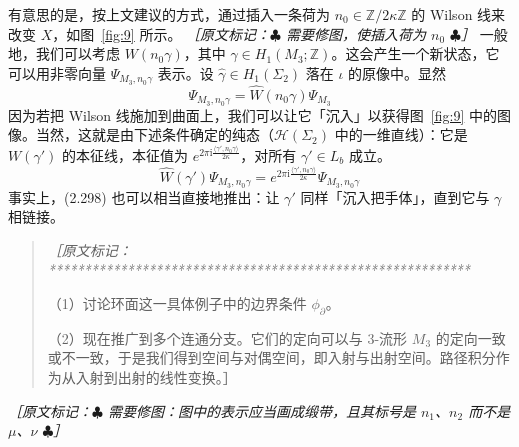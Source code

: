 有意思的是，按上文建议的方式，通过插入一条荷为 $n_0\in\mathbb{Z}/2\kappa\mathbb{Z}$ 的 Wilson 线来改变 $X$，如图~\ref{fig:9} 所示。
{\small\itshape ［原文标记：\ensuremath{\clubsuit} 需要修图，使插入荷为 $n_0$ \ensuremath{\clubsuit}］}
一般地，我们可以考虑 $W(n_0\gamma)$，其中 $\gamma\in H_1(M_3;\mathbb{Z})$。这会产生一个新状态，它可以用非零向量 $\Psi_{M_3,n_0\gamma}$ 表示。设 $\hat\gamma\in H_1(\Sigma_2)$ 落在 $\iota$ 的原像中。显然
\begin{equation}
  \Psi_{M_3,n_0\gamma}=\widehat{W}(n_0\gamma)\Psi_{M_3}
  \tag{2.297}
  \label{eq:2.297}
\end{equation}
因为若把 Wilson 线施加到曲面上，我们可以让它「沉入」以获得图~\ref{fig:9} 中的图像。当然，这就是由下述条件确定的纯态（$\mathcal{H}(\Sigma_2)$ 中的一维直线）：它是 $W(\gamma')$ 的本征线，本征值为 $e^{2\pi\mathrm{i}\frac{\langle\gamma',n_0\gamma\rangle}{2\kappa}}$，对所有 $\gamma'\in L_b$ 成立。
\begin{equation}
  \widehat{W}(\gamma')\Psi_{M_3,n_0\gamma}
  =e^{2\pi\mathrm{i}\frac{\langle\gamma',n_0\gamma\rangle}{2\kappa}}\Psi_{M_3,n_0\gamma}
  \tag{2.298}
  \label{eq:2.298}
\end{equation}
事实上，(2.298) 也可以相当直接地推出：让 $\gamma'$ 同样「沉入把手体」，直到它与 $\gamma$ 相链接。

\begin{quote}
\small\itshape
［原文标记：***********************************************************

（1）讨论环面这一具体例子中的边界条件 $\phi_\partial$。

（2）现在推广到多个连通分支。它们的定向可以与 3-流形 $M_3$ 的定向一致或不一致，于是我们得到空间与对偶空间，即入射与出射空间。路径积分作为从入射到出射的线性变换。］
\end{quote}

{\small\itshape ［原文标记：\ensuremath{\clubsuit} 需要修图：图中的表示应当画成缎带，且其标号是 $n_1$、$n_2$ 而不是 $\mu$、$\nu$ \ensuremath{\clubsuit}］}
